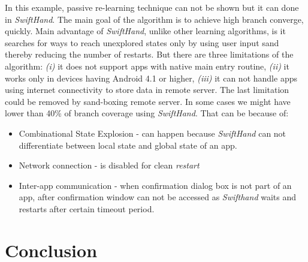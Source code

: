 \documentclass[authoryear,preprint, twocolumn]{sigplanconf}
\begin{document}
\newline In this example, passive re-learning technique can not be shown but it can done in \emph{SwiftHand}. The main goal of the algorithm is to achieve high branch converge, quickly. Main advantage of \emph{SwiftHand}, unlike other learning algorithms, is it searches for ways to reach unexplored states only by using user input sand thereby reducing the number of restarts. But there are three limitations of the algorithm: \emph{(i)} it does not support apps with native main entry routine, \emph{(ii)} it works only in devices having Android 4.1 or higher, \emph{(iii)} it can not handle apps using internet connectivity to store data in remote server. The last limitation could be removed by sand-boxing remote server. In some cases we might have lower than 40\% of branch coverage using \emph{SwiftHand}. That can be because of:
\begin{itemize}
	\item Combinational State Explosion - can happen because \emph{SwiftHand} can not differentiate between local state and global state of an app.
	\item Network connection - is disabled for clean \emph{restart}
	\item Inter-app communication - when confirmation dialog box is not part of an app, after confirmation window can not be accessed as \emph{Swifthand} waits and restarts after certain timeout period.
\end{itemize} 

\section{Conclusion}
\label{sec:conclusion}
\end{document}

